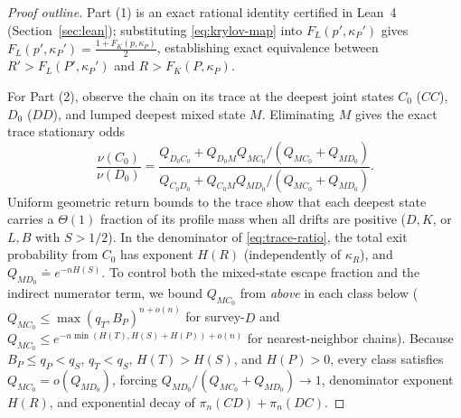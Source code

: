 \documentclass[11pt,reqno]{amsart}
\theoremstyle{definition}
\theoremstyle{remark}
\begin{document}
\begin{proof}[Proof outline]
Part (1) is an exact rational identity certified in Lean~4 (Section~\ref{sec:lean}); substituting \eqref{eq:krylov-map} into $F_L(p',\kappa_P')$ gives $F_L(p',\kappa_P') = \frac{1 + F_K(p,\kappa_P)}{2}$, establishing exact equivalence between $R' > F_L(P',\kappa_P')$ and $R > F_K(P,\kappa_P)$.

For Part (2), observe the chain on its trace at the deepest joint states $C_0$ ($CC$), $D_0$ ($DD$), and lumped deepest mixed state $M$. Eliminating $M$ gives the exact trace stationary odds
\begin{equation}\label{eq:trace-ratio}
  \frac{\nu(C_0)}{\nu(D_0)} = \frac{Q_{D_0 C_0} + Q_{D_0 M} Q_{M C_0}/(Q_{M C_0} + Q_{M D_0})}{Q_{C_0 D_0} + Q_{C_0 M} Q_{M D_0}/(Q_{M C_0} + Q_{M D_0})}.
\end{equation}
Uniform geometric return bounds to the trace show that each deepest state carries a $\Theta(1)$ fraction of its profile mass when all drifts are positive ($D, K$, or $L,B$ with $S > 1/2$). In the denominator of \eqref{eq:trace-ratio}, the total exit probability from $C_0$ has exponent $H(R)$ (independently of $\kappa_R$), and $Q_{MD_0} \doteq e^{-n H(S)}$. To control both the mixed-state escape fraction and the indirect numerator term, we bound $Q_{MC_0}$ from \emph{above} in each class below ($Q_{MC_0} \le \max(q_T, B_P)^{n+o(n)}$ for survey-$D$ and $Q_{MC_0} \le e^{-n\min(H(T), H(S)+H(P)) + o(n)}$ for nearest-neighbor chains). Because $B_P \le q_P < q_S$, $q_T < q_S$, $H(T) > H(S)$, and $H(P) > 0$, every class satisfies $Q_{MC_0} = o(Q_{MD_0})$, forcing $Q_{MD_0}/(Q_{MC_0}+Q_{MD_0}) \to 1$, denominator exponent $H(R)$, and exponential decay of $\pi_n(CD)+\pi_n(DC)$.


\end{proof}
\end{document}
